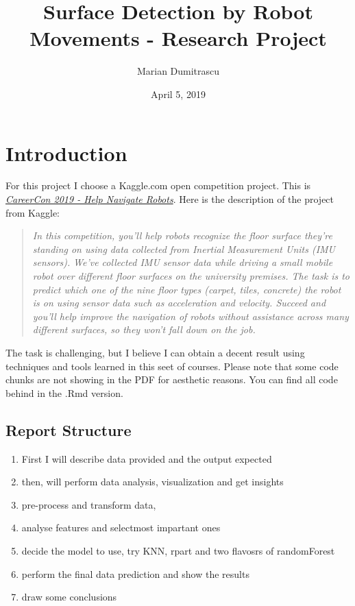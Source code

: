 \documentclass[]{article}
\title{Surface Detection by Robot Movements - Research Project}
\author{Marian Dumitrascu}
\date{April 5, 2019}
\providecommand{\tightlist}{%
  \setlength{\itemsep}{0pt}\setlength{\parskip}{0pt}}
\begin{document}
\maketitle

\hypertarget{introduction}{%
\section{Introduction}\label{introduction}}

For this project I choose a Kaggle.com open competition project. This is
\href{https://www.kaggle.com/c/career-con-2019}{\emph{CareerCon 2019 -
Help Navigate Robots}}. Here is the description of the project from
Kaggle:

\begin{quote}
\emph{In this competition, you'll help robots recognize the floor
surface they're standing on using data collected from Inertial
Measurement Units (IMU sensors).} \emph{We've collected IMU sensor data
while driving a small mobile robot over different floor surfaces on the
university premises. The task is to predict which one of the nine floor
types (carpet, tiles, concrete) the robot is on using sensor data such
as acceleration and velocity. Succeed and you'll help improve the
navigation of robots without assistance across many different surfaces,
so they won't fall down on the job.}
\end{quote}

The task is challenging, but I believe I can obtain a decent result
using techniques and tools learned in this seet of courses. Please note
that some code chunks are not showing in the PDF for aesthetic reasons.
You can find all code behind in the .Rmd version.

\hypertarget{report-structure}{%
\subsection{Report Structure}\label{report-structure}}

\begin{enumerate}
\def\labelenumi{\arabic{enumi}.}
\tightlist
\item
  First I will describe data provided and the output expected
\item
  then, will perform data analysis, visualization and get insights
\item
  pre-process and transform data,
\item
  analyse features and selectmost impartant ones
\item
  decide the model to use, try KNN, rpart and two flavosrs of
  randomForest
\item
  perform the final data prediction and show the results
\item
  draw some conclusions
\end{enumerate}
\end{document}
